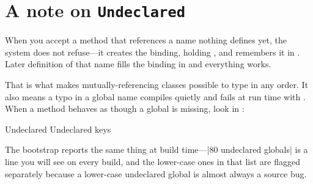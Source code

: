 \section{A note on \texttt{Undeclared}}

When you accept a method that references a name nothing defines yet, the
system does not refuse---it creates the binding, holding , and
remembers it in . Later definition of that name fills the
binding in and everything works.

That is what makes mutually-referencing classes possible to type in any order.
It also means a typo in a global name compiles quietly and fails at run time
with . When a method behaves as though a global is
missing, look in :

\begin{st}
Undeclared
Undeclared keys
\end{st}

The bootstrap reports the same thing at build time---\ct|80 undeclared globals| is a line you will see on every build, and the lower-case ones in
that list are flagged separately because a lower-case undeclared global is
almost always a source bug.
